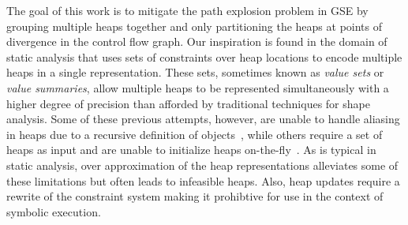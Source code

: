 The goal of this work is to mitigate the path explosion problem in GSE
by grouping multiple heaps together and only partitioning the heaps at
points of divergence in the control flow graph. Our inspiration is
found in the domain of static analysis that uses sets of constraints
over heap locations to encode multiple heaps in a single
representation. These sets, sometimes known as \emph{value sets} or
\emph{value summaries}, allow multiple heaps to be represented
simultaneously with a higher degree of precision than afforded by
traditional techniques for shape analysis. Some of these previous
attempts, however, are unable to handle aliasing in heaps due to a
recursive definition of objects~\cite{Xie:2005}, while others require
a set of heaps as input and are unable to initialize heaps
on-the-fly~\cite{Dillig:2011,Tillmann:2008}.  As is typical in static
analysis, over approximation of the heap representations alleviates
some of these limitations but often leads to infeasible heaps. Also,
heap updates require a rewrite of the constraint system making it
prohibtive for use in the context of symbolic execution.

\begin{comment}
Unfortunately, value sets often do not support aliasing and require a
recursive definition of objects~\cite{..}. Also, heap updates often
require that the path constraint be rewritten to reflect the update,
and the constraints in the value set may also need to be rewritten with the
addition of auxiliary variables. These non-local operations make it
difficult to use value sets in symbolic execution. As is
typical in static analysis, over approximation of the value sets
alleviates some of the limitations but also leads to false positives.
\end{comment}




